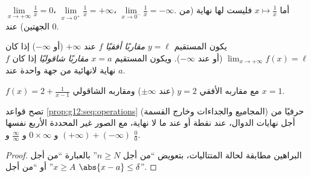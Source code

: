 \begin{example}
$\lim\limits_{x\to+\infty} \frac{1}{x} = 0$،
$\lim\limits_{x\to 0^+} \frac{1}{x} = +\infty$،
$\lim\limits_{x\to 0^-} \frac{1}{x} = -\infty$. أما 
$x \mapsto \frac1x$ فليست لها نهاية (من الجهتين) عند $0$.
\end{example}

\begin{definition}[المقاربات]\label{def:g12:limcont:asymptote}
يكون المستقيم $y = \ell$ \emph{مقاربًا أفقيًا} 
$f$ عند $+\infty$ (أو $-\infty$) إذا كان
$\lim_{x\to+\infty} f(x) = \ell$ (أو عند $-\infty$). ويكون المستقيم $x = a$
\emph{مقاربًا شاقوليًا} إذا كان  $f$ نهاية لانهائية من جهة واحدة عند $a$.
\end{definition}

\begin{omfigure}

{\small {} $f(x) = 2 + \frac{1}{x-1}$ مع مقاربه الأفقي
$y = 2$ (عند $\pm\infty$) ومقاربه الشاقولي $x = 1$.}
\end{omfigure}

\begin{proposition}\label{prop:g12:limcont:operations}
تصح قواعد \cref{prop:g12:seq:operations} (المجاميع والجداءات وخارج القسمة)
حرفيًا من أجل نهايات الدوال، عند نقطة أو عند ما لا نهاية، مع الصور
غير المحددة الأربع نفسها $(+\infty)+(-\infty)$ و $0\times\infty$ و
$\frac{\infty}{\infty}$ و $\frac{0}{0}$.
\end{proposition}

\begin{proof}
البراهين مطابقة لحالة المتتاليات، بتعويض ``من أجل $n \geq N$''
بالعبارة ``من أجل $x \geq A$'' أو ``من أجل $\abs{x-a} \leq \delta$''.
\end{proof}

